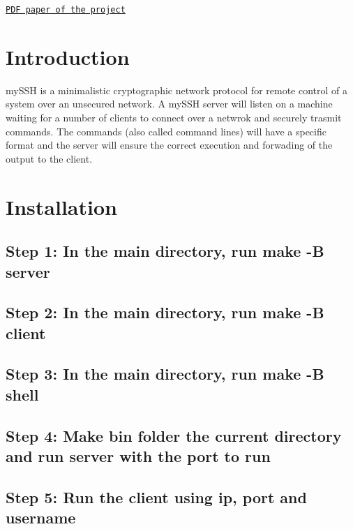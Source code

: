 \href{../mySSH.pdf}{\tt P\+DF paper of the project}\hypertarget{index_intro_sec}{}\section{Introduction}\label{index_intro_sec}
my\+S\+SH is a minimalistic cryptographic network protocol for remote control of a system over an unsecured network. A my\+S\+SH server will listen on a machine waiting for a number of clients to connect over a netwrok and securely trasmit commands. The commands (also called command lines) will have a specific format and the server will ensure the correct execution and forwading of the output to the client.\hypertarget{index_install_sec}{}\section{Installation}\label{index_install_sec}
\hypertarget{index_step1}{}\subsection{Step 1\+: In the main directory, run make -\/\+B server}\label{index_step1}
\hypertarget{index_step2}{}\subsection{Step 2\+: In the main directory, run make -\/\+B client}\label{index_step2}
\hypertarget{index_step3}{}\subsection{Step 3\+: In the main directory, run make -\/\+B shell}\label{index_step3}
\hypertarget{index_step4}{}\subsection{Step 4\+: Make bin folder the current directory and run server with the port to run}\label{index_step4}
\hypertarget{index_step5}{}\subsection{Step 5\+: Run the client using ip, port and username}\label{index_step5}
